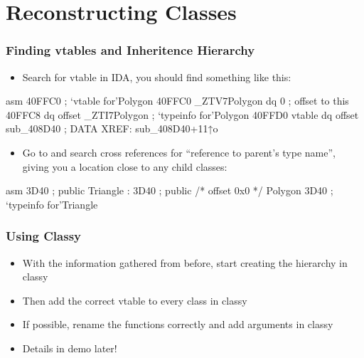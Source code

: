 \documentclass[aspectratio=169]{beamer}
\begin{document}
\section{Reconstructing Classes}

\begin{frame}[fragile]
    \frametitle{Finding vtables and Inheritence Hierarchy}
    \begin{itemize}
        \item Search for vtable in IDA, you should find something like this:
    \end{itemize}
\begin{codebox}{asm}
40FFC0 ; `vtable for'Polygon
40FFC0 _ZTV7Polygon    dq 0                    ; offset to this
40FFC8                 dq offset _ZTI7Polygon  ; `typeinfo for'Polygon
40FFD0 vtable      dq offset sub_408D40    ; DATA XREF: sub_408D40+11↑o
\end{codebox}
\begin{itemize}
    \item Go to  and search cross references for ``reference to parent's type name'', giving you a location close to any child classes:
\end{itemize}
\begin{codebox}{asm}
3D40 ; public Triangle :
3D40 ;   public /* offset 0x0 */ Polygon
3D40 ; `typeinfo for'Triangle
\end{codebox}
\end{frame}

\begin{frame}
    \frametitle{Using Classy}
\begin{itemize}
    \item With the information gathered from before, start creating the hierarchy in classy
    \item Then add the correct vtable to every class in classy
    \item If possible, rename the functions correctly and add arguments in classy
    \item Details in demo later!
\end{itemize}
\end{frame}
\end{document}
